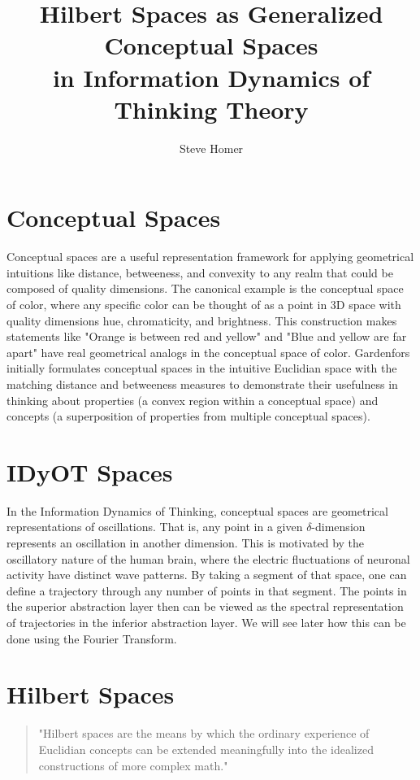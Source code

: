 \documentclass{article}
\title{\textbf{Hilbert Spaces as Generalized Conceptual Spaces} \\
in Information Dynamics of Thinking Theory}
\author{Steve Homer}
\begin{document}
\maketitle

\section{Conceptual Spaces}
Conceptual spaces are a useful representation framework for applying geometrical intuitions like distance, betweeness, and convexity to any realm that could be composed of quality dimensions.  The canonical example is the conceptual space of color, where any specific color can be thought of as a point in 3D space with quality dimensions hue, chromaticity, and brightness.  This construction makes statements like "Orange is between red and yellow" and "Blue and yellow are far apart" have real geometrical analogs in the conceptual space of color.  Gardenfors initially formulates conceptual spaces in the intuitive Euclidian space with the matching distance and betweeness measures to demonstrate their usefulness in thinking about properties (a convex region within a conceptual space) and concepts (a superposition of properties from multiple conceptual spaces). 

\section{IDyOT Spaces}
In the Information Dynamics of Thinking, conceptual spaces are geometrical representations of oscillations.  That is, any point in a given $\delta$-dimension represents an oscillation in another dimension. This is motivated by the oscillatory nature of the human brain, where the electric fluctuations of neuronal activity have distinct wave patterns. By taking a segment of that space, one can define a trajectory through any number of points in that segment.  The points in the superior abstraction layer then can be viewed as the spectral representation of trajectories in the inferior abstraction layer.  We will see later how this can be done using the Fourier Transform.

\section{Hilbert Spaces}

\begin{quote}
  "Hilbert spaces are the means by which the ordinary experience of Euclidian concepts can be extended meaningfully into the idealized constructions of more complex math."
\end{quote}
\end{document}
